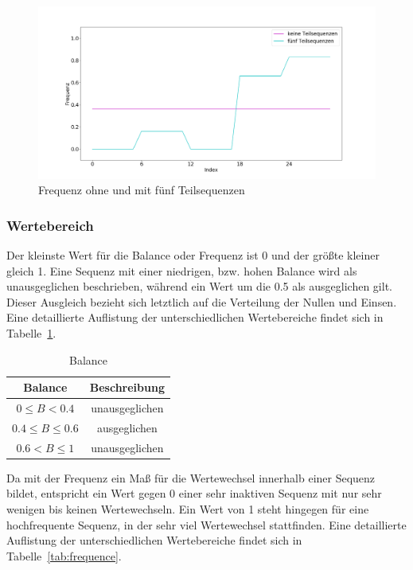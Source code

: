 \begin{theorem}
\begin{figure}[H]
	\centering
	\includegraphics[scale=0.32]{images/Teilsequenzen/teilsequenzen_frequenz}
	\caption{Frequenz ohne und mit fünf Teilsequenzen}
	\label{fig:subsequences-frequency}
\end{figure}
\end{theorem}

\subsubsection{Wertebereich}

Der kleinste Wert für die Balance oder Frequenz ist 0 und der größte kleiner gleich 1. Eine Sequenz mit einer niedrigen, bzw. hohen Balance wird als unausgeglichen beschrieben, während ein Wert um die 0.5 als ausgeglichen gilt. Dieser Ausgleich bezieht sich letztlich auf die Verteilung der Nullen und Einsen. Eine detaillierte Auflistung der unterschiedlichen Wertebereiche findet sich in Tabelle~\ref{tab:balance}. 

\begin{table}[H]
	\begin{center}
		\begin{tabular}{|c c|} 
			\hline
			Balance & Beschreibung \\
			\hline\hline
			$0 \leq B < 0.4$ & unausgeglichen \\ 
			\hline
			$0.4 \leq B \leq 0.6$ & ausgeglichen \\
			\hline
			$0.6 < B \leq 1$ & unausgeglichen \\
			\hline
		\end{tabular}
		\caption{Balance}
		\label{tab:balance}
	\end{center}
\end{table}

Da mit der Frequenz ein Maß für die Wertewechsel innerhalb einer Sequenz bildet, entspricht ein Wert gegen 0 einer sehr inaktiven Sequenz mit nur sehr wenigen bis keinen Wertewechseln. Ein Wert von 1 steht hingegen für eine hochfrequente Sequenz, in der sehr viel Wertewechsel stattfinden. Eine detaillierte Auflistung der unterschiedlichen Wertebereiche findet sich in Tabelle~\ref{tab:frequence}. 


